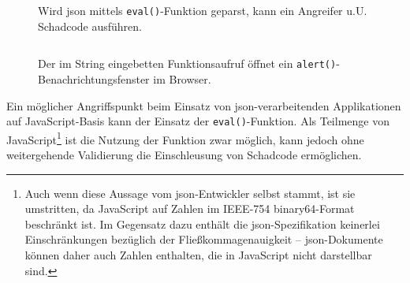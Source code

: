 \begin{figure}[h]
\begin{example} Wird \acrshort{json} mittels \texttt{eval()}-Funktion geparst, kann ein Angreifer u.U. Schadcode ausführen.
\inputminted{javascript}{json-eval.js}
\begin{center}
\end{center}
\caption{Der im String eingebetten Funktionsaufruf öffnet ein \texttt{alert()}-Benachrichtungsfenster im Browser.}
\end{example}
\end{figure}

Ein möglicher Angriffspunkt beim Einsatz von \acrshort{json}-verarbeitenden Applikationen auf JavaScript-Basis kann der Einsatz der \texttt{eval()}-Funktion\cite[Abschnitt 18.2.1]{ecma262}. Als Teilmenge von JavaScript\footnote{Auch wenn diese Aussage vom \acrshort{json}-Entwickler selbst stammt\cite{crockford2006fatfree}, ist sie umstritten, da JavaScript auf Zahlen im IEEE-754 binary64-Format\cite[Abschnitt 6.1.6]{ecma262} beschränkt ist. Im Gegensatz dazu enthält die \acrshort{json}-Spezifikation keinerlei Einschränkungen bezüglich der Fließkommagenauigkeit\cite[Abschnitt 8]{ecma404} -- \acrshort{json}-Dokumente können daher auch Zahlen enthalten, die in JavaScript nicht darstellbar sind.} ist die Nutzung der Funktion zwar möglich, kann jedoch ohne weitergehende Validierung die Einschleusung von Schadcode ermöglichen.
